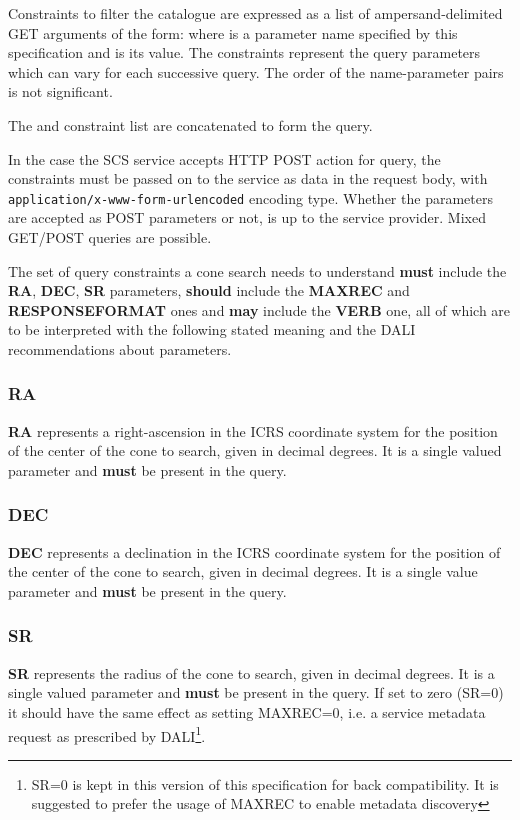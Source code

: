 \documentclass[11pt,a4paper]{ivoa}
\begin{document}
Constraints to filter the catalogue are expressed as a list of ampersand-delimited GET arguments of the form:  where  is a parameter name specified by this specification and  is its value. The constraints represent the query parameters which can vary for each successive query. The order of the name-parameter pairs is not significant.

The  and constraint list are concatenated to form the query.

In the case the SCS service accepts HTTP POST action for query, the  constraints must be passed on to the service as data in the request body, with \texttt{application/x-www-form-urlencoded} encoding type. Whether the  parameters are accepted as POST parameters or not, is up to the service provider. Mixed GET/POST queries are possible.

The set of query constraints a cone search needs to understand \textbf{must} include the \textbf{RA}, \textbf{DEC}, \textbf{SR} parameters, \textbf{should} include the \textbf{MAXREC} and \textbf{RESPONSEFORMAT} ones and \textbf{may} include the \textbf{VERB} one, all of which are to be interpreted with the following stated meaning and the DALI recommendations about parameters.

\subsubsection{RA}
\textbf{RA} represents a right-ascension in the ICRS coordinate system for the position of the center of the cone to search, given in decimal degrees. It is a single valued parameter and \textbf{must} be present in the query.

\subsubsection{DEC}
\textbf{DEC} represents a declination in the ICRS coordinate system for the position of the center of the cone to search, given in decimal degrees. It is a single value parameter and \textbf{must} be present in the query.

\subsubsection{SR}
\textbf{SR} represents the radius of the cone to search, given in decimal degrees. It is a single valued parameter and \textbf{must} be present in the query. If set to zero (SR=0) it should have the same effect as setting MAXREC=0, i.e. a service metadata request as prescribed by DALI\footnote{SR=0 is kept in this version of this specification for back compatibility. It is suggested to prefer the usage of MAXREC to enable metadata discovery}.
\end{document}
